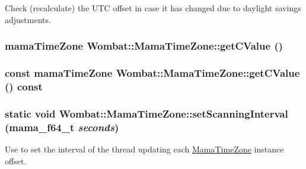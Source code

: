 Check (recalculate) the UTC offset in case it has changed due to daylight savings adjustments. \hypertarget{classWombat_1_1MamaTimeZone_aeb0632d3849ab689b818b14ffd80f2b1}{
\subsubsection[{getCValue}]{\setlength{\rightskip}{0pt plus 5cm}mamaTimeZone Wombat::MamaTimeZone::getCValue ()}}
\label{classWombat_1_1MamaTimeZone_aeb0632d3849ab689b818b14ffd80f2b1}
\hypertarget{classWombat_1_1MamaTimeZone_abcd925e29643428d8816f6df3177480b}{
\subsubsection[{getCValue}]{\setlength{\rightskip}{0pt plus 5cm}const mamaTimeZone Wombat::MamaTimeZone::getCValue () const}}
\label{classWombat_1_1MamaTimeZone_abcd925e29643428d8816f6df3177480b}
\hypertarget{classWombat_1_1MamaTimeZone_aaf9aac46af8f7ed2ae85d3476fd7975f}{
\subsubsection[{setScanningInterval}]{\setlength{\rightskip}{0pt plus 5cm}static void Wombat::MamaTimeZone::setScanningInterval (mama\_\-f64\_\-t {\em seconds})}}
\label{classWombat_1_1MamaTimeZone_aaf9aac46af8f7ed2ae85d3476fd7975f}


Use to set the interval of the thread updating each \hyperlink{classWombat_1_1MamaTimeZone}{MamaTimeZone} instance offset. 